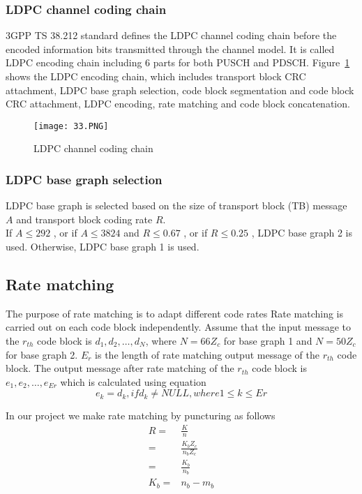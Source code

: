 \subsubsection{LDPC channel coding chain}
3GPP TS 38.212 standard defines the LDPC channel coding chain before the encoded information bits transmitted through the channel model. It is called LDPC encoding chain including 6 parts for both PUSCH and PDSCH. Figure~\ref{fig:coding chain} shows the LDPC encoding chain, which includes transport block CRC attachment, LDPC base graph selection, code block segmentation and code block CRC attachment, LDPC encoding, rate matching and code block concatenation. 

\begin{figure}[h]
\centering
\texttt{[image: 33.PNG]}
\caption{LDPC channel coding chain}
\label{fig:coding chain}
\end{figure}

\subsubsection{LDPC base graph selection}
LDPC base graph is selected based on the size of transport block (TB) message $A$ and transport block coding rate $R$. \\
If $A \leq 292$ , or if $A \leq 3824$ and $R \leq 0.67$ , or if $R \leq 0.25$ , LDPC base graph 2 is used. 
Otherwise, LDPC base graph 1 is used.

\subsection{Rate matching}
The purpose of rate matching is to adapt different code rates
Rate matching is carried out on each code block independently. Assume that the input message to the $r_{th}$ code block is $d_1, d_2, \ldots , d_N$, where $N = 66Z_c$ for base graph 1 and $N = 50Z_c$ for base graph 2. $E_r$ is the length of rate matching output message of the $r_{th}$ code block. The output message after rate matching of the $r_{th}$ code block is $e_1, e_2, \ldots , e_{Er}$ which is calculated using equation
\[e_k = d_k, if d_k \neq NULL, where  1 \leq k \leq Er\] 

In our project we make rate matching by puncturing as follows
\begin{equation}
    \label{eq:rate}
    \begin{aligned}
        R = & \frac{K}{n} \\
        = & \frac{K_bZ_c}{n_bZ_c} \\
        = & \frac{K_b}{n_b} \\
        K_b = & n_b - m_b
    \end{aligned}
\end{equation}

